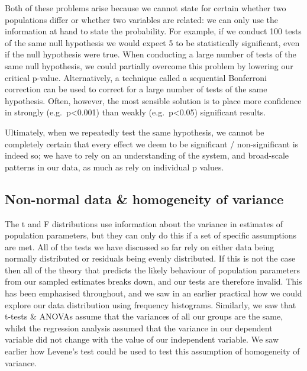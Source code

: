 \documentclass[
]{book}
\begin{document}
Both of these problems arise because we cannot state for certain whether two populations differ or whether two variables are related: we can only use the information at hand to state the probability. For example, if we conduct 100 tests of the same null hypothesis we would expect 5 to be statistically significant, even if the null hypothesis were true. When conducting a large number of tests of the same null hypothesis, we could partially overcome this problem by lowering our critical p-value. Alternatively, a technique called a sequential Bonferroni correction can be used to correct for a large number of tests of the same hypothesis. Often, however, the most sensible solution is to place more confidence in strongly (e.g.~p\textless0.001) than weakly (e.g.~p\textless0.05) significant results.

Ultimately, when we repeatedly test the same hypothesis, we cannot be completely certain that every effect we deem to be significant / non-significant is indeed so; we have to rely on an understanding of the system, and broad-scale patterns in our data, as much as rely on individual p values.

\hypertarget{non-normal-data-homogeneity-of-variance}{%
\subsection*{Non-normal data \& homogeneity of variance}\label{non-normal-data-homogeneity-of-variance}}

The t and F distributions use information about the variance in estimates of population parameters, but they can only do this if a set of specific assumptions are met. All of the tests we have discussed so far rely on either data being normally distributed or residuals being evenly distributed. If this is not the case then all of the theory that predicts the likely behaviour of population parameters from our sampled estimates breaks down, and our tests are therefore invalid. This has been emphasised throughout, and we saw in an earlier practical how we could explore our data distribution using frequency histograms. Similarly, we saw that t-tests \& ANOVAs assume that the variances of all our groups are the same, whilst the regression analysis assumed that the variance in our dependent variable did not change with the value of our independent variable. We saw earlier how Levene's test could be used to test this assumption of homogeneity of variance.
\end{document}
